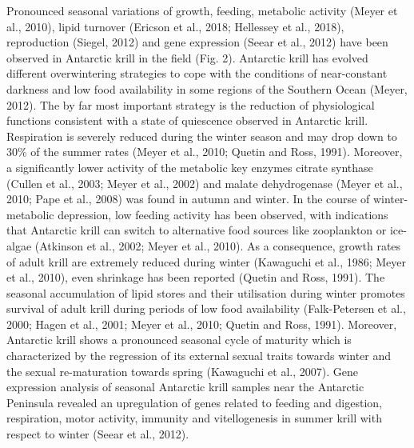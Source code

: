 Pronounced seasonal variations of growth, feeding, metabolic activity (Meyer et
al., 2010), lipid turnover (Ericson et al., 2018; Hellessey et al., 2018),
reproduction (Siegel, 2012) and gene expression (Seear et al., 2012) have been
observed in Antarctic krill in the field (Fig. 2). Antarctic krill has evolved
different overwintering strategies to cope with the conditions of near-constant
darkness and low food availability in some regions of the Southern Ocean
(Meyer, 2012). The by far most important strategy is the reduction of
physiological functions consistent with a state of quiescence observed in
Antarctic krill. Respiration is severely reduced during the winter season and
may drop down to 30\% of the summer rates (Meyer et al., 2010; Quetin and Ross,
1991). Moreover, a significantly lower activity of the metabolic key enzymes
citrate synthase (Cullen et al., 2003; Meyer et al., 2002) and malate
dehydrogenase (Meyer et al., 2010; Pape et al., 2008) was found in autumn and
winter. In the course of winter-metabolic depression, low feeding activity has
been observed, with indications that Antarctic krill can switch to alternative
food sources like zooplankton or ice-algae (Atkinson et al., 2002; Meyer et
al., 2010). As a consequence, growth rates of adult krill are extremely reduced
during winter (Kawaguchi et al., 1986; Meyer et al., 2010), even shrinkage has
been reported (Quetin and Ross, 1991). The seasonal accumulation of lipid
stores and their utilisation during winter promotes survival of adult krill
during periods of low food availability (Falk-Petersen et al., 2000; Hagen et
al., 2001; Meyer et al., 2010; Quetin and Ross, 1991). Moreover, Antarctic
krill shows a pronounced seasonal cycle of maturity which is characterized by
the regression of its external sexual traits towards winter and the sexual
re-maturation towards spring (Kawaguchi et al., 2007). Gene expression analysis
of seasonal Antarctic krill samples near the Antarctic Peninsula revealed an
upregulation of genes related to feeding and digestion, respiration, motor
activity, immunity and vitellogenesis in summer krill with respect to winter
(Seear et al., 2012).

